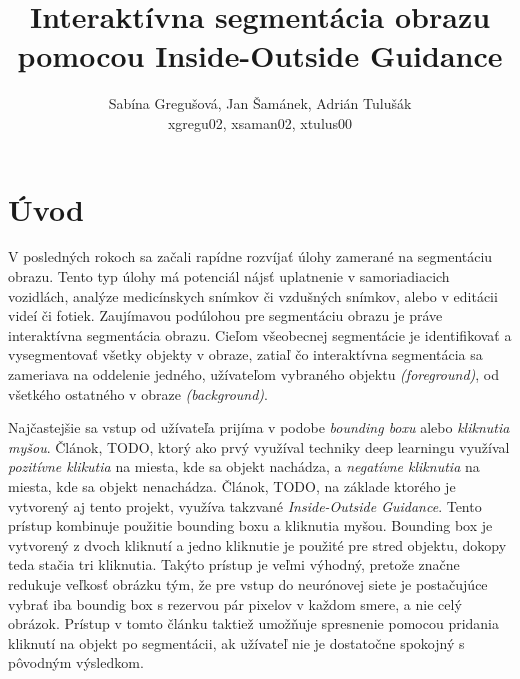 \documentclass [11pt, a4paper]{article}
\begin{document}
\title{Interaktívna segmentácia obrazu pomocou Inside-Outside Guidance}
\author{Sabína Gregušová, Jan Šamánek, Adrián Tulušák\\xgregu02, xsaman02, xtulus00}
\date{}
\maketitle

\section{Úvod}
V posledných rokoch sa začali rapídne rozvíjať úlohy zamerané na segmentáciu obrazu. Tento typ úlohy má potenciál nájsť uplatnenie v samoriadiacich vozidlách, analýze medicínskych snímkov či vzdušných snímkov, alebo v editácii videí či fotiek. Zaujímavou podúlohou pre segmentáciu obrazu je práve interaktívna segmentácia obrazu. Cieľom všeobecnej segmentácie je identifikovať a vysegmentovať všetky objekty v obraze, zatiaľ čo interaktívna segmentácia sa zameriava na oddelenie jedného, užívateľom vybraného objektu \textit{(foreground)}, od všetkého ostatného v obraze \textit{(background)}.

Najčastejšie sa vstup od užívateľa prijíma v podobe \textit{bounding boxu} alebo \textit{kliknutia myšou}. Článok, TODO, ktorý ako prvý využíval techniky deep learningu využíval \textit{pozitívne klikutia} na miesta, kde sa objekt nachádza, a \textit{negatívne kliknutia} na miesta, kde sa objekt nenachádza. Článok, TODO, na základe ktorého je vytvorený aj tento projekt, využíva takzvané \textit{Inside-Outside Guidance}. Tento prístup kombinuje použitie bounding boxu a kliknutia myšou. Bounding box je vytvorený z dvoch kliknutí a jedno kliknutie je použité pre stred objektu, dokopy teda stačia tri kliknutia. Takýto prístup je veľmi výhodný, pretože značne redukuje veľkosť obrázku tým, že pre vstup do neurónovej siete je postačujúce vybrať iba boundig box s rezervou pár pixelov v každom smere, a nie celý obrázok. Prístup v tomto článku taktiež umožňuje spresnenie pomocou pridania kliknutí na objekt po segmentácii, ak užívateľ nie je dostatočne spokojný s pôvodným výsledkom.
\end{document}

